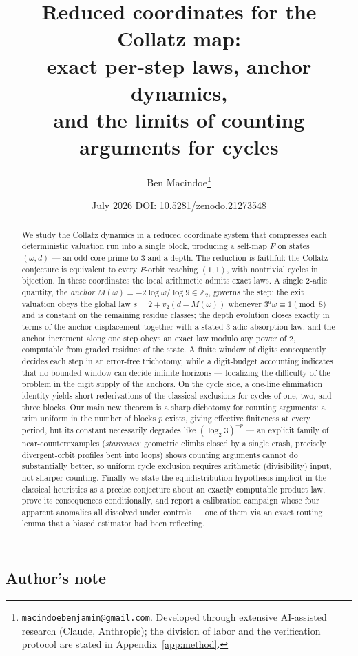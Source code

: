 \documentclass[11pt]{article}
\title{Reduced coordinates for the Collatz map:\\ exact per-step laws, anchor dynamics,\\ and the limits of counting arguments for cycles}
\author{Ben Macindoe\thanks{\texttt{macindoebenjamin@gmail.com}. Developed through extensive AI-assisted research (Claude, Anthropic); the division of labor and the verification protocol are stated in Appendix~\ref{app:method}.}}
\date{July 2026 \;\cdot\; DOI: \href{https://doi.org/10.5281/zenodo.21273548}{10.5281/zenodo.21273548}}
\theoremstyle{remark}
\newcommand{\Z}{\mathbb{Z}}
\newcommand{\vt}[1]{v_2\!\left(#1\right)}
\newcommand{\w}{\omega}
\newcommand{\LL}{\log_2 3}
\begin{document}
\maketitle

\begin{abstract}
We study the Collatz dynamics in a reduced coordinate system that compresses each deterministic valuation run into a single block, producing a self-map $F$ on states $(\w,d)$ --- an odd core prime to $3$ and a depth. The reduction is faithful: the Collatz conjecture is equivalent to every $F$-orbit reaching $(1,1)$, with nontrivial cycles in bijection. In these coordinates the local arithmetic admits exact laws. A single $2$-adic quantity, the \emph{anchor} $M(\w) = -2\log\w/\log 9 \in \Z_2$, governs the step: the exit valuation obeys the global law $s = 2 + \vt{d - M(\w)}$ whenever $3^d\w \equiv 1 \pmod 8$ and is constant on the remaining residue classes; the depth evolution closes exactly in terms of the anchor displacement together with a stated $3$-adic absorption law; and the anchor increment along one step obeys an exact law modulo any power of $2$, computable from graded residues of the state. A finite window of digits consequently decides each step in an error-free trichotomy, while a digit-budget accounting indicates that no bounded window can decide infinite horizons --- localizing the difficulty of the problem in the digit supply of the anchors. On the cycle side, a one-line elimination identity yields short rederivations of the classical exclusions for cycles of one, two, and three blocks. Our main new theorem is a sharp dichotomy for counting arguments: a trim uniform in the number of blocks $p$ exists, giving effective finiteness at every period, but its constant necessarily degrades like $(\LL)^{-p}$ --- an explicit family of near-counterexamples (\emph{staircases}: geometric climbs closed by a single crash, precisely divergent-orbit profiles bent into loops) shows counting arguments cannot do substantially better, so uniform cycle exclusion requires arithmetic (divisibility) input, not sharper counting. Finally we state the equidistribution hypothesis implicit in the classical heuristics as a precise conjecture about an exactly computable product law, prove its consequences conditionally, and report a calibration campaign whose four apparent anomalies all dissolved under controls --- one of them via an exact routing lemma that a biased estimator had been reflecting.
\end{abstract}

\subsection*{Author's note}
\end{document}

